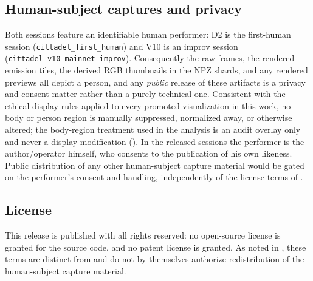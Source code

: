 \subsection{Human-subject captures and privacy}
\label{sec:availability:privacy}

Both sessions feature an identifiable human performer: D2 is the first-human session (\texttt{cittadel\_first\_human}) and V10 is an improv session (\texttt{cittadel\_v10\_mainnet\_improv}). Consequently the raw frames, the rendered emission tiles, the derived RGB thumbnails in the NPZ shards, and any rendered previews all depict a person, and any \emph{public} release of these artifacts is a privacy and consent matter rather than a purely technical one. Consistent with the ethical-display rules applied to every promoted visualization in this work, no body or person region is manually suppressed, normalized away, or otherwise altered; the body-region treatment used in the analysis is an audit overlay only and never a display modification (). In the released sessions the performer is the author/operator himself, who consents to the publication of his own likeness. Public distribution of any other human-subject capture material would be gated on the performer's consent and handling, independently of the license terms of .

\subsection{License}
\label{sec:availability:license}

This release is published with all rights reserved: no open-source license is granted for the source code, and no patent license is granted. As noted in , these terms are distinct from and do not by themselves authorize redistribution of the human-subject capture material.
